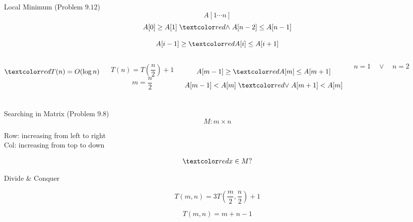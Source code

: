 \begin{frame}{}
  \begin{exampleblock}{Local Minimum (Problem $9.12$)}
    \[
      A[1 \cdots n]
    \]
    \[
      A[0] \ge A[1] \;\red{\land}\; A[n-2] \le A[n-1]
    \]

    \[
      A[i-1] \ge \red{A[i]} \le A[i+1]
    \]
  \end{exampleblock}

  \vspace{0.60cm}
  \begin{columns}
      \pause
      \[
	\red{T(n) = O(\log n)}
      \]

      \pause
      \[
	T(n) = T(\frac{n}{2}) + 1
      \]
      \pause
      \[
	m = \frac{n}{2}
      \]

      \pause
      \[
	A[m-1] \ge \red{A[m]} \le A[m+1]
      \]
      \[
	A[m-1] < A[m] \;\red{\lor}\; A[m+1] < A[m]
      \]

      \pause
      \[
	n = 1 \quad \lor \quad n = 2
      \]
  \end{columns}
\end{frame}

\begin{frame}{}
  \begin{exampleblock}{Searching in Matrix (Problem $9.8$)}
    \[
      M: m \times n
    \]

    \begin{center}
      {Row: increasing from left to right} \\[6pt]
      {Col: increasing from top to down}
    \end{center}

    \vspace{-0.50cm}
    \[
      \red{x \in M?}
    \]
  \end{exampleblock}

  \pause
  \vspace{0.30cm}
  \centerline{Divide \& Conquer}

  \pause
  \[
    T(m,n) = 3T(\frac{m}{2}, \frac{n}{2}) + 1 
  \]


  \pause
  \vspace{0.30cm}
  \centerline{}

  \pause
  \[
    T(m, n) = m + n - 1
  \]
\end{frame}

